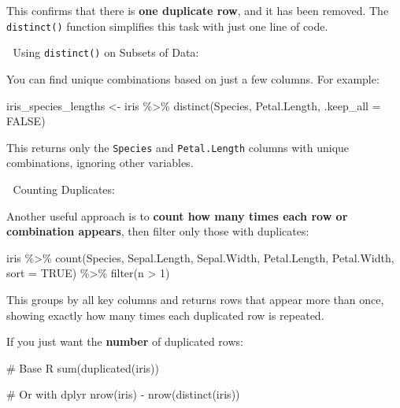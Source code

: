 \documentclass[
  man,
  floatsintext,
  longtable,
  nolmodern,
  notxfonts,
  notimes,
  colorlinks=true,linkcolor=blue,citecolor=blue,urlcolor=blue]{apa7}
\newenvironment{Shaded}{\begin{snugshade}}{\end{snugshade}}
\newcommand{\AttributeTok}[1]{\textcolor[rgb]{0.40,0.45,0.13}{#1}}
\newcommand{\CommentTok}[1]{\textcolor[rgb]{0.37,0.37,0.37}{#1}}
\newcommand{\ConstantTok}[1]{\textcolor[rgb]{0.56,0.35,0.01}{#1}}
\newcommand{\DecValTok}[1]{\textcolor[rgb]{0.68,0.00,0.00}{#1}}
\newcommand{\FunctionTok}[1]{\textcolor[rgb]{0.28,0.35,0.67}{#1}}
\newcommand{\NormalTok}[1]{\textcolor[rgb]{0.00,0.23,0.31}{#1}}
\newcommand{\OtherTok}[1]{\textcolor[rgb]{0.00,0.23,0.31}{#1}}
\newcommand{\SpecialCharTok}[1]{\textcolor[rgb]{0.37,0.37,0.37}{#1}}
\begin{document}
This confirms that there is \textbf{one duplicate row}, and it has been
removed. The \texttt{distinct()} function simplifies this task with just
one line of code.

🔹 Using \texttt{distinct()} on Subsets of Data:

You can find unique combinations based on just a few columns. For
example:

\begin{Shaded}
\begin{Highlighting}[]
\NormalTok{iris\_species\_lengths }\OtherTok{\textless{}{-}}\NormalTok{ iris }\SpecialCharTok{\%\textgreater{}\%}
  \FunctionTok{distinct}\NormalTok{(Species, Petal.Length, }\AttributeTok{.keep\_all =} \ConstantTok{FALSE}\NormalTok{)}
\end{Highlighting}
\end{Shaded}

This returns only the \texttt{Species} and \texttt{Petal.Length} columns
with unique combinations, ignoring other variables.

🔹 Counting Duplicates:

Another useful approach is to \textbf{count how many times each row or
combination appears}, then filter only those with duplicates:

\begin{Shaded}
\begin{Highlighting}[]
\NormalTok{iris }\SpecialCharTok{\%\textgreater{}\%}
  \FunctionTok{count}\NormalTok{(Species, Sepal.Length, Sepal.Width, Petal.Length, Petal.Width, }\AttributeTok{sort =} \ConstantTok{TRUE}\NormalTok{) }\SpecialCharTok{\%\textgreater{}\%}
  \FunctionTok{filter}\NormalTok{(n }\SpecialCharTok{\textgreater{}} \DecValTok{1}\NormalTok{)}
\end{Highlighting}
\end{Shaded}

This groups by all key columns and returns rows that appear more than
once, showing exactly how many times each duplicated row is repeated.

If you just want the \textbf{number} of duplicated rows:

\begin{Shaded}
\begin{Highlighting}[]
\CommentTok{\# Base R}
\FunctionTok{sum}\NormalTok{(}\FunctionTok{duplicated}\NormalTok{(iris))}

\CommentTok{\# Or with dplyr}
\FunctionTok{nrow}\NormalTok{(iris) }\SpecialCharTok{{-}} \FunctionTok{nrow}\NormalTok{(}\FunctionTok{distinct}\NormalTok{(iris))}
\end{Highlighting}
\end{Shaded}
\end{document}
